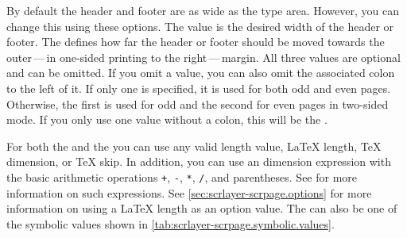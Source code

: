 \begin{Declaration}
\end{Declaration}
By default the header and footer are
as wide as the type area. However, you can change this using these
\KOMAScript{} options. The value  is the desired width of the
header or footer. The  defines how far the header or footer
should be moved towards the outer\,---\,in one-sided printing to the
right\,---\,margin. All three
values are optional and can be omitted. If you omit a value, you can also omit
the associated colon to the left of it. If only one  is
specified, it is used for both odd and even pages. Otherwise, the first
 is used for odd and the second  for even pages in
two-sided mode. If you only use one value without a colon, this will be the
.

For both the  and the  you can use any valid length
value, \LaTeX{} length, \TeX{} dimension, or \TeX{} skip. In addition, you can
use an \eTeX{} dimension expression with the basic arithmetic operations
\texttt{+}, \texttt{-}, \texttt{*}, \texttt{/}, and parentheses. See
\cite[section~3.5]{manual:eTeX} for more information on such expressions. See
\autoref{sec:scrlayer-scrpage.options} for more information on using a
\LaTeX{} length as an option value. The  can also be one of the
symbolic values shown in \autoref{tab:scrlayer-scrpage.symbolic.values}.

